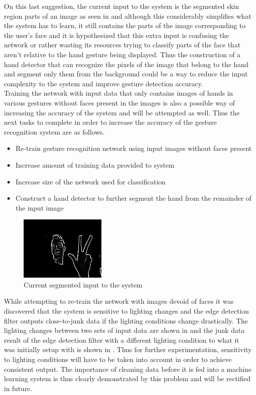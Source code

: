 On this last suggestion, the current input to the system is the segmented skin region parts of an image as seen in  and although this considerably simplifies what the system has to learn, it still contains the parts of the image corresponding to the user's face and it is hypothesized that this extra input is confusing the network or rather wasting its resources trying to classify parts of the face that aren't relative to the hand gesture being displayed. Thus the construction of a hand detector that can recognize the pixels of the image that belong to the hand and segment only them from the background could be a way to reduce the input complexity to the system and improve gesture detection accuracy. \\

Training the network with input data that only contains images of hands in various gestures without faces present in the images is also a possible way of increasing the accuracy of the system and will be attempted as well. Thus the next tasks to complete in order to increase the accuracy of the gesture recognition system are as follows.

\begin{itemize}
    \item Re-train gesture recognition network using input images without faces present
    \item Increase amount of training data provided to system
    \item Increase size of the network used for classification
    \item Construct a hand detector to further segment the hand from the remainder of the input image
  \end{itemize}

\begin{figure}[h]
    \centering
    \includegraphics[width=0.3\linewidth]{figures/network_skin_segmented_input.png}
    \caption{Current segmented input to the system}
    \label{fig:network_skin_segmented_input}
\end{figure}

While attempting to re-train the network with images devoid of faces it was discovered that the system is sensitive to lighting changes and the edge detection filter outputs close-to-junk data if the lighting conditions change drastically. The lighting changes between two sets of input data are shown in  and the junk data result of the edge detection filter with a different lighting condition to what it was initially setup with is shown in . Thus for further experimentation, sensitivity to lighting conditions will have to be taken into account in order to achieve consistent output. The importance of cleaning data before it is fed into a machine learning system is thus clearly demonstrated by this problem and will be rectified in future.


